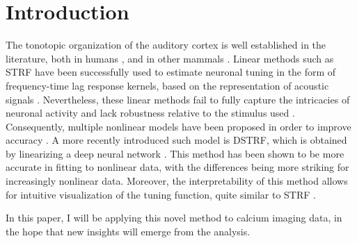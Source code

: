 \chapter{Introduction}\label{introduction}

The tonotopic organization of the auditory cortex is well established in the literature, both in humans \parencite{saenzTonotopicMappingHuman2014}, and in other mammals \parencite{realeTonotopicOrganizationAuditory1980,bizleyFunctionalOrganizationFerret2005}. Linear methods such as STRF have been successfully used to estimate neuronal tuning in the form of frequency-time lag response kernels, based on the representation of acoustic signals \parencite{aertsenSpectrotemporalReceptiveFields1980a}. Nevertheless, these linear methods fail to fully capture the intricacies of neuronal activity and lack robustness relative to the stimulus used \parencite{ahrensNonlinearitiesContextualInfluences2008}. Consequently, multiple nonlinear models have been proposed in order to improve accuracy \parencite{meyerModelsNeuronalStimulusResponse2017}. A more recently introduced such model is DSTRF, which is obtained by linearizing a deep neural network \parencite{keshishianEstimatingInterpretingNonlinear2020}. This method has been shown to be more accurate in fitting to nonlinear data, with the differences being more striking for increasingly nonlinear data. Moreover, the interpretability of this method allows for intuitive visualization of the tuning function, quite similar to STRF \parencite{keshishianEstimatingInterpretingNonlinear2020}.

In this paper, I will be applying this novel method to calcium imaging data, in the hope that new insights will emerge from the analysis.

